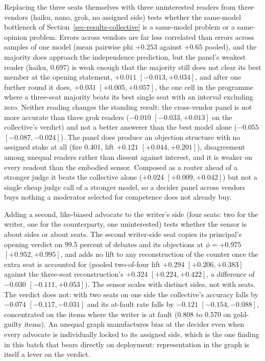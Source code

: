Replacing the three seats themselves with three uninterested readers from
three vendors (haiku, nano, grok, no assigned side) tests whether the
same-model bottleneck of Section~\ref{sec-results-collective} is a same-model
problem or a same-opinion problem. Errors across vendors are far less
correlated than errors across samples of one model (mean pairwise phi
$+0.253$ against $+0.65$ pooled), and the majority does approach the
independence prediction, but the panel's weakest reader (haiku, 0.697) is
weak enough that the majority still does not clear its best member at the
opening statement, $+0.011$ $[-0.013, +0.034]$, and after one further round
it does, $+0.031$ $[+0.005, +0.057]$, the one cell in the programme where a
three-seat majority beats its best single seat with an interval excluding
zero.
Neither reading changes the standing result: the cross-vendor panel is not
more accurate than three grok readers ($-0.010$ $[-0.033, +0.013]$ on the
collective's verdict) and not a better answerer than the best model alone
($-0.055$ $[-0.087, -0.024]$). The panel does produce an objection
structure with no assigned stake at all (fire 0.401, lift $+0.121$
$[+0.044, +0.201]$), disagreement among unequal readers rather than dissent
against interest, and it is weaker on every readout than the embodied
sensor. Composed as a router ahead of a stronger judge it beats the
collective alone ($+0.024$ $[+0.009, +0.042]$) but not a single cheap
judge call of a stronger model, so a decider panel across vendors buys
nothing a moderator selected for competence does not already buy.

Adding a second, like-biased advocate to the writer's side (four seats: two
for the writer, one for the counterparty, one uninterested) tests whether
the sensor is about sides or about seats. The second writer-side seat
copies its principal's opening verdict on 99.5 percent of debates and its
objections at $\phi=+0.975$ $[+0.952, +0.995]$, and adds no lift to any
reconstruction of the counter once the extra seat is accounted for
(pooled two-of-four lift $+0.294$ $[+0.206, +0.383]$ against the three-seat
reconstruction's $+0.324$ $[+0.224, +0.422]$, a difference of $-0.030$
$[-0.111, +0.053]$).
The sensor scales with distinct sides, not with seats. The verdict does
not: with two seats on one side the collective's accuracy falls by
$-0.074$ $[-0.117, -0.031]$ and its at-fault rate falls by $-0.121$
$[-0.154, -0.088]$, concentrated on the items where the writer is at fault
(0.808 to 0.570 on gold-guilty items). An unequal graph manufactures bias
at the decider even when every advocate is individually locked to its
assigned side, which is the one finding in this batch that bears directly
on deployment: representation in the graph is itself a lever on the
verdict.

